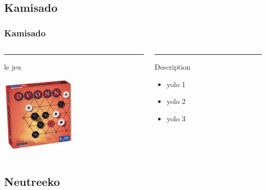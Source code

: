 \documentclass[11pt]{beamer}
\begin{document}
\subsection[Kamisado]{Kamisado} 
\begin{frame}
\frametitle{Kamisado}

\begin{columns}[T] %
\begin{column}{.35\textwidth}
\color{red}\rule{\linewidth}{4pt}
 le jeu

\begin{center}
\includegraphics[width=100pt]{images/dvon.jpg}
\end{center}
\end{column}%

\hfill%
\begin{column}{.62\textwidth}
\color{blue}\rule{\linewidth}{4pt}
Description
\begin{itemize}
\item yolo 1
\item yolo 2
\item yolo 3
\end{itemize}
\end{column}%
\end{columns}

\end{frame}

\subsection[Neutreeko]{Neutreeko} 
\end{document}
